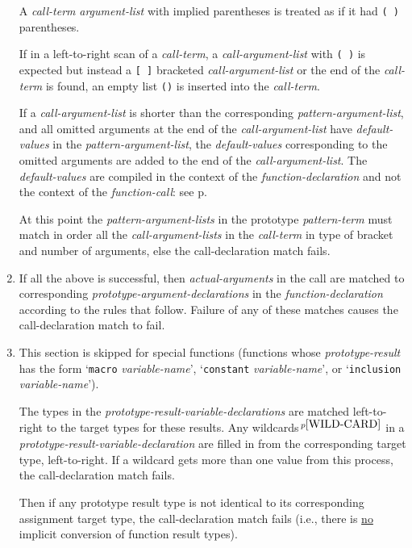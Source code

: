\documentclass[12pt]{article}
\newcommand{\pagref}[1]{p\pageref{#1}}
\newcommand{\pagnote}[1]{$\,^{p\pageref{#1}}$}
\begin{document}
\begin{enumerate}
A {\em call-term} {\em argument-list} with implied parentheses
is treated as if it had {\tt (~)} parentheses.

If in a left-to-right scan of a {\em call-term},
a {\em call-argument-list} with {\tt (~)} is expected but instead
a {\tt [~]} bracketed {\em call-argument-list} or
the end of the {\em call-term} is found,
an empty list {\tt ()} is inserted into the {\em call-term}.

If a {\em call-argument-list} is shorter than the
corresponding {\em pattern-argument-list}, and all omitted
arguments at the end of the {\em call-argument-list} have {\em default-values}
in the {\em pattern-argument-list}, the {\em default-values} corresponding
to the omitted arguments are added to
the end of the {\em call-argument-list}.
The {\em default-values} are compiled in the context of the
{\em function-declaration} and not the context of the {\em function-call}:
see \pagref{DEFAULT-CONTEXT}.

At this point the {\em pattern-argument-lists} in the prototype
{\em pattern-term} must match in order all the {\em call-argument-lists}
in the {\em call-term} in type of bracket and number
of arguments, else the call-declaration match fails.

\item If all the above is successful, then {\em actual-arguments}
in the call are matched to corresponding {\em prototype-argument-declarations}
in the {\em function-declaration} according to the rules that follow.
Failure of any of these matches causes
the call-declaration match to fail.

\item\label{CALL-DECLARATION-TARGET-MATCHING}
This section is skipped for special functions (functions whose
{\em prototype-result} has the form `{\tt macro} {\em variable-name}',
`{\tt constant} {\em variable-name}', or
`{\tt inclusion} {\em variable-name}').

The types in the {\em prototype-result-variable-declarations} are
matched left-to-right to the target types for these results.
Any wildcards\pagnote{WILD-CARD} in a
{\em prototype-result-variable-declaration}
are filled in from the corresponding target type, left-to-right.
If a wildcard gets more
than one value from this process, the call-declaration match fails.

Then if any prototype result type is not identical to its corresponding
assignment target type, the call-declaration match fails
(i.e., there is \underline{no} implicit conversion of function result
types).


\end{enumerate}
\end{document}

